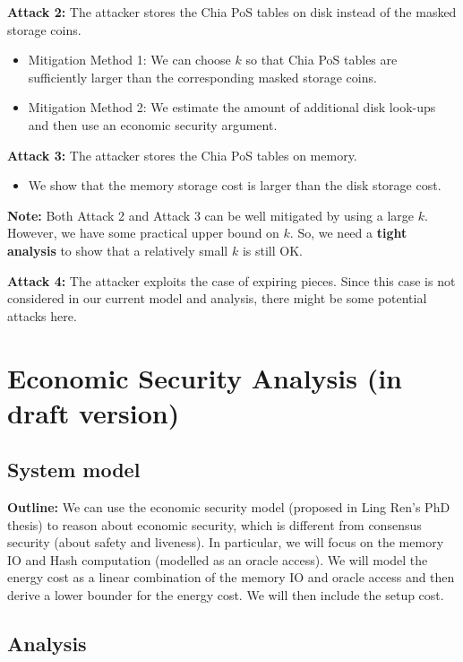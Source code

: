 \documentclass[12pt,draftcls,onecolumn]{IEEEtran}
\begin{document}
{\bf Attack 2:} The attacker stores the Chia PoS tables on disk instead of the masked storage coins.

\begin{itemize}
    \item Mitigation Method 1: We can choose $k$ so that Chia PoS tables are sufficiently larger than the corresponding masked storage coins.
    \item Mitigation Method 2: We estimate the amount of additional disk look-ups and then use an economic security argument.
\end{itemize}

{\bf Attack 3:} The attacker stores the Chia PoS tables on memory.

\begin{itemize}
    \item We show that the memory storage cost is larger than the disk storage cost.
\end{itemize}

{\bf Note:} Both Attack 2 and Attack 3 can be well mitigated by using a large $k$. However, we have some practical upper bound on $k$. So, we need a {\bf tight analysis} to show that a relatively small $k$ is still OK.

{\bf Attack 4:} The attacker exploits the case of expiring pieces. Since this case is not considered in our current model and analysis, there might be some potential attacks here.



\section{Economic Security Analysis (in draft version)}

\subsection{System model}

{\bf Outline:} We can use the economic security model (proposed in Ling Ren's PhD thesis) to reason about economic security, which is different from consensus security (about safety and liveness). In particular, we will focus on the memory IO and Hash computation (modelled as an oracle access). We will model the energy cost as a linear combination of the memory IO and oracle access and then derive a lower bounder for the energy cost. We will then include the setup cost.

\subsection{Analysis}
\end{document}

